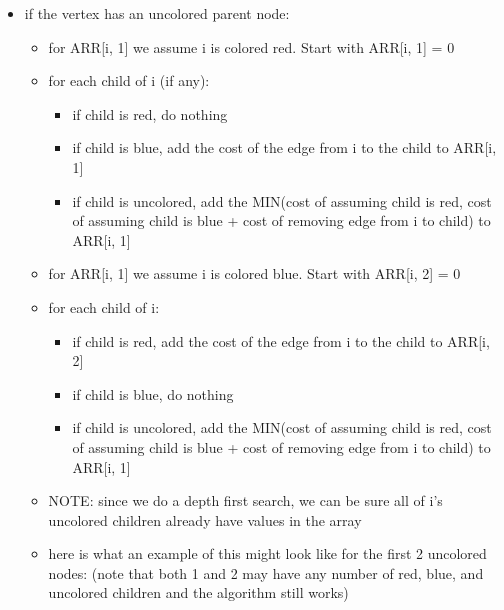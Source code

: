 \documentclass[a4paper]{article}
\begin{document}
\begin{itemize}
    \item if the vertex has an uncolored parent node:
    \begin{itemize}
        \item for ARR[i, 1] we assume i is colored red. Start with ARR[i, 1] = 0
        \item for each child of i (if any):
        \begin{itemize}
            \item if child is red, do nothing
            \item if child is blue, add the cost of the edge from i to the child to ARR[i, 1]
            \item if child is uncolored, add the MIN(cost of assuming child is red, cost of assuming child is blue + cost of removing edge from i to child) to ARR[i, 1]
        \end{itemize}
        \item for ARR[i, 1] we assume i is colored blue. Start with ARR[i, 2] = 0
        \item for each child of i:
        \begin{itemize}
            \item if child is red, add the cost of the edge from i to the child to ARR[i, 2]
            \item if child is blue, do nothing
            \item if child is uncolored, add the MIN(cost of assuming child is red, cost of assuming child is blue + cost of removing edge from i to child) to ARR[i, 1]
        \end{itemize}
        \item NOTE: since we do a depth first search, we can be sure all of i's uncolored children already have values in the array
        \item here is what an example of this might look like for the first 2 uncolored nodes: (note that both 1 and 2 may have any number of red, blue, and uncolored children and the algorithm still works)
    \end{itemize}
\end{itemize}
\end{document}
